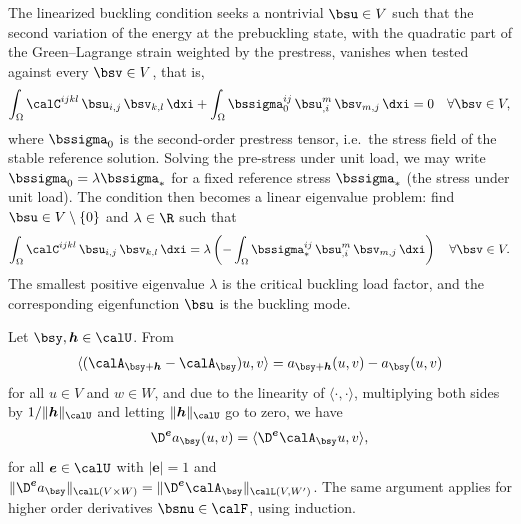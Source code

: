 The linearized buckling condition seeks a nontrivial $\bsu \in V$ such that the second variation of the energy at the prebuckling state, with the quadratic part of the Green--Lagrange strain weighted by the prestress, vanishes when tested against every $\bsv \in V$, that is,
\begin{align*}
    \int_{\Omega} \calC^{ijkl}\, \bsu_{i,j}\, \bsv_{k,l} \,\dxi
    + \int_{\Omega} \bssigma_0^{ij}\, \bsu^m_{,i}\, \bsv_{m,j} \,\dxi = 0
    \quad \forall \bsv \in V,
\end{align*}
where $\bssigma_0$ is the second-order prestress tensor, i.e.\ the stress field of the stable reference solution. Solving the pre-stress under unit load, we may write $\bssigma_0 = \lambda \bssigma_*$ for a fixed reference stress $\bssigma_*$ (the stress under unit load). The condition then becomes a linear eigenvalue problem: find $\bsu \in V\setminus\{0\}$ and $\lambda \in \R$ such that
\begin{align*}
    \int_{\Omega}\calC^{ijkl}\, \bsu_{i,j}\, \bsv_{k,l}\,\dxi
    = \lambda \left( - \int_{\Omega} \bssigma_*^{ij}\, \bsu^m_{,i}\, \bsv_{m,j}\,\dxi \right)
    \quad \forall \bsv \in V.
\end{align*}
The smallest positive eigenvalue $\lambda$ is the critical buckling load factor, and the corresponding eigenfunction $\bsu$ is the buckling mode. 



 Let $\bsy, \boldsymbol{h} \in \calU$.
From  \begin{align*}
    \langle (\calA_{\bsy + \boldsymbol{h}  } -  \calA_{\bsy })u,v \rangle = a_{\bsy + \boldsymbol{h} }(u,v) - a_{\bsy}(u,v) 
\end{align*} for all $u \in V$ and $ w \in W$, and due to the linearity of $\langle \cdot, \cdot \rangle$, multiplying both sides by $1/\| \boldsymbol{h}  \|_{\calU}$ and letting  $\| \boldsymbol{h}  \|_{\calU}$ go to zero, we have
 \begin{align*}
     \D^{\boldsymbol{e}} a_\bsy (u,v) =  \langle \D^{\boldsymbol{e}} \calA_\bsy u , v \rangle, 
 \end{align*} for all $\boldsymbol{e} \in \calU $ with $\vert \boldsymbol{e} \vert = 1$ and $\| \D^{\boldsymbol{e}} a_\bsy  \|_{\calL(V\times W)} = \| \D^{\boldsymbol{e}} \calA_\bsy  \|_{\calL(V,W')} $. 
 The same argument applies for higher order derivatives $\bsnu \in \calF$, using induction.




